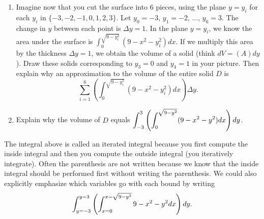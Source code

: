 \begin{problem}
\begin{enumerate}
 \item Imagine now that you cut the surface into 6 pieces, using the plane $y=y_i$ for each $y_i$ in $\{-3,-2,-1,0, 1, 2,3\}$. Let $y_0=-3$, $y_1=-2$, $\ldots$, $y_{6}=3$. The change in $y$ between each point is $\Delta y=1$. 
 In the plane $y=y_i$, we know the area under the surface is $\int_0^{\sqrt{9-y_i^2}} (9-x^2-y_i^2) dx$.  If we multiply this area by the thickness $\Delta y=1$, we obtain the volume of a solid (think $dV = (A)dy$).  Draw these solids corresponding to $y_3=0$ and $y_4=1$ in your picture. Then explain why an approximation to the volume of the entire solid $D$ is 
$$\sum_{i=1}^6 \left(\int_0^{\sqrt{9-y_i^2}} (9-x^2-y_i^2) dx\right) \Delta y.$$
\item Explain why the volume of $D$ equals $\displaystyle\int_{-3}^{3} \left(\int_0^{\sqrt{9-y^2}}(9-x^2-y^2) dx\right) dy$.
\end{enumerate}
\end{problem}

The integral above is called an iterated integral because you first compute the inside integral and then you compute the outside integral (you iteratively integrate). Often the parenthesis are not written because we know that the inside integral should be performed first without writing the parenthesis. We could also explicitly emphasize which variables go with each bound by writing
$$\displaystyle\int_{y=-3}^{y=3} \left(\int_{x=0}^{x=\sqrt{9-y^2}}9-x^2-y^2 dx\right) dy.$$   

